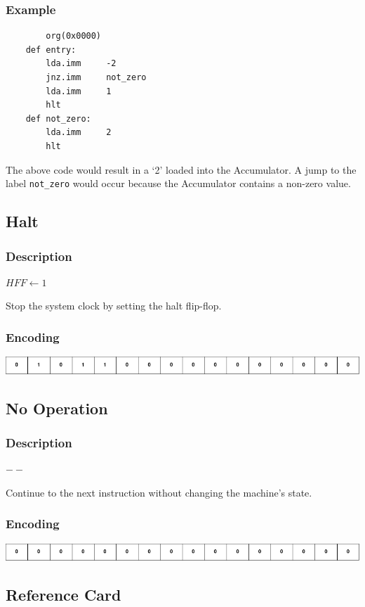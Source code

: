     \subsubsection{Example}
    \begin{verbatim}
        org(0x0000)
    def entry:
        lda.imm     -2
        jnz.imm     not_zero
        lda.imm     1
        hlt
    def not_zero:
        lda.imm     2
        hlt
    \end{verbatim}
    The above code would result in a `2' loaded into the Accumulator.
    A jump to the label \texttt{not\_zero} would occur because the Accumulator
    contains a non-zero value.

\pagebreak
\subsection{Halt}\label{subsec:halt}
    \subsubsection{Description}
    $HFF \leftarrow 1$
    \par Stop the system clock by setting the halt flip-flop.
    \subsubsection{Encoding}
    \begin{center}
        \includegraphics[scale=0.40]{img/Andromeda-HLT.drawio}
    \end{center}

\subsection{No Operation}\label{subsec:nop}
    \subsubsection{Description}
    $ -- $
    \par Continue to the next instruction without changing the machine's state.
    \subsubsection{Encoding}
    \begin{center}
        \includegraphics[scale=0.40]{img/Andromeda-NOP.drawio}
    \end{center}

\subsection{Reference Card}\label{subsec:reference-card2}